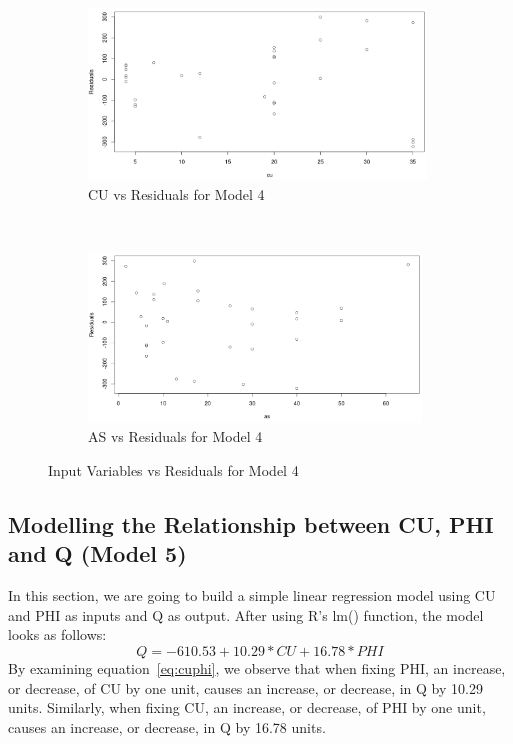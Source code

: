 \documentclass[a4paper,12pt, english]{article}
\begin{document}
\begin{figure}[H]
        \centering
        \begin{subfigure}[b]{0.85\textwidth}
                \includegraphics[width=0.986\textwidth]{mod4-resid1}
  		\caption{CU vs Residuals for Model 4}
  		\label{fig:mod4-resid1}
        \end{subfigure}%
        ~ %
        
        \begin{subfigure}[b]{0.85\textwidth}
                \includegraphics[width=0.96986\textwidth]{mod4-resid2}
  		\caption{AS vs Residuals for Model 4}
 		 \label{fig:mod4-resid2}
        \end{subfigure}
        
        \caption{Input Variables vs Residuals for Model 4}
        \label{fig:mod4-resids}
\end{figure}

\subsection{Modelling the Relationship between CU, PHI and Q (Model 5)} \label{sec:cuphimodel}
In this section, we are going to build a simple linear regression model using CU and PHI as inputs and Q as output. After using R's lm() function, the model looks as follows:\\
\begin{equation}
\label{eq:cuphi}
Q = -610.53  +     10.29*CU   +     16.78*PHI
\end{equation}       
By examining equation~\ref{eq:cuphi}, we observe that when fixing PHI, an increase, or decrease, of CU by one unit, causes an increase, or decrease, in Q by 10.29 units.
Similarly, when fixing CU, an increase, or decrease, of PHI by one unit, causes an increase, or decrease, in Q by 16.78 units.
\end{document}

